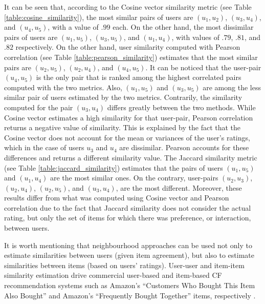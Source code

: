 It can be seen that, according to the Cosine vector similarity metric (see Table \ref{table:cosine_similarity}), the most similar pairs of users are $(u_{1}, u_{2})$, $(u_{3}, u_{4})$, and $(u_{4}, u_{5})$, with a value of $.99$ each. On the other hand, the most dissimilar pairs of users are $(u_{1}, u_{5})$, $(u_{3}, u_{5})$, and $(u_{1}, u_{4})$, with values of $.79$, $.81$, and $.82$ respectively.
On the other hand, user similarity computed with Pearson correlation (see Table \ref{table:pearson_similarity}) estimates that the most similar pairs are $(u_{2}, u_{5})$, $(u_{2}, u_{4})$, and $(u_{4}, u_{5})$. 
It can be noticed that the user-pair $(u_{4}, u_{5})$ is the only pair that is ranked among the highest correlated pairs computed with the two metrics.
Also, $(u_{1}, u_{5})$ and $(u_{3}, u_{5})$ are among the less similar pair of users estimated by the two metrics. 
Contrarily, the similarity computed for the pair $(u_{3}, u_{4})$ differs greatly between the two methods. While Cosine vector estimates a high similarity for that user-pair, Pearson correlation returns a negative value of similarity. This is explained by the fact that the Cosine vector does not account for the mean or variances of the user's ratings, which in the case of users $u_{3}$ and $u_{4}$ are dissimilar. Pearson accounts for these differences and returns a different similarity value.
The Jaccard similarity metric (see Table \ref{table:jaccard_similarity}) estimates that the pairs of users $(u_{1}, u_{5})$ and $(u_{1}, u_{4})$ are the most similar ones. On the contrary, user-pairs $(u_{2}, u_{3})$, $(u_{2}, u_{4})$, $(u_{2}, u_{5})$, and $(u_{3}, u_{4})$,  are the most different. Moreover, these results differ from what was computed using Cosine vector and Pearson correlation due to the fact that Jaccard similarity does not consider the actual rating, but only the set of items for which there was preference, or interaction, between users. 

It is worth mentioning that neighbourhood approaches can be used not only to estimate similarities between users (given item agreement), but also to estimate similarities between items (based on users' ratings). User-user and item-item similarity estimation drive commercial user-based and item-based CF recommendation systems such as Amazon's ``Customers Who Bought This Item Also Bought'' and Amazon's ``Frequently Bought Together'' items, respectively \autocite{linden03amazon}.

